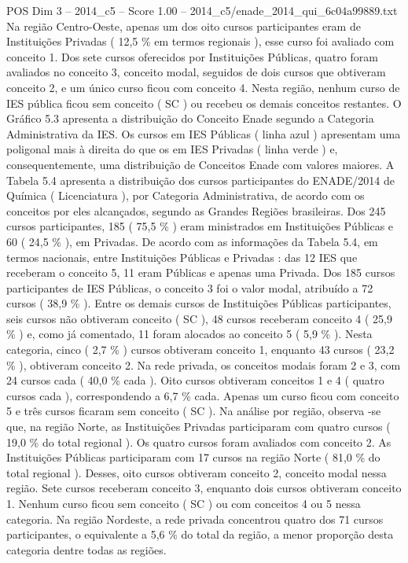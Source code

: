 \begin{textsample}{POS Dim 3 – 2014\_c5 – Score 1.00 – 2014\_c5/enade\_2014\_qui\_6c04a99889.txt}
Na região Centro-Oeste, apenas um dos oito cursos participantes eram de Instituições Privadas ( 12,5 \% em termos regionais ), esse curso foi avaliado com conceito 1.
Dos sete cursos oferecidos por Instituições Públicas, quatro foram avaliados no conceito 3, conceito modal, seguidos de dois cursos que obtiveram conceito 2, e um único curso ficou com conceito 4.
Nesta região, nenhum curso de IES pública ficou sem conceito ( SC ) ou recebeu os demais conceitos restantes.
O Gráfico 5.3 apresenta a distribuição do Conceito Enade segundo a Categoria Administrativa da IES.
Os cursos em IES Públicas ( linha azul ) apresentam uma poligonal mais à direita do que os em IES Privadas ( linha verde ) e, consequentemente, uma distribuição de Conceitos Enade com valores maiores.
A Tabela 5.4 apresenta a distribuição dos cursos participantes do ENADE/2014 de Química ( Licenciatura ), por Categoria Administrativa, de acordo com os conceitos por eles alcançados, segundo as Grandes Regiões brasileiras.
Dos 245 cursos participantes, 185 ( 75,5 \% ) eram ministrados em Instituições Públicas e 60 ( 24,5 \% ), em Privadas.
De acordo com as informações da Tabela 5.4, em termos nacionais, entre Instituições Públicas e Privadas : das 12 IES que receberam o conceito 5, 11 eram Públicas e apenas uma Privada.
Dos 185 cursos participantes de IES Públicas, o conceito 3 foi o valor modal, atribuído a 72 cursos ( 38,9 \% ).
Entre os demais cursos de Instituições Públicas participantes, seis cursos não obtiveram conceito ( SC ), 48 cursos receberam conceito 4 ( 25,9 \% ) e, como já comentado, 11 foram alocados ao conceito 5 ( 5,9 \% ).
Nesta categoria, cinco ( 2,7 \% ) cursos obtiveram conceito 1, enquanto 43 cursos ( 23,2 \% ), obtiveram conceito 2.
Na rede privada, os conceitos modais foram 2 e 3, com 24 cursos cada ( 40,0 \% cada ).
Oito cursos obtiveram conceitos 1 e 4 ( quatro cursos cada ), correspondendo a 6,7 \% cada.
Apenas um curso ficou com conceito 5 e três cursos ficaram sem conceito ( SC ).
Na análise por região, observa -se que, na região Norte, as Instituições Privadas participaram com quatro cursos ( 19,0 \% do total regional ).
Os quatro cursos foram avaliados com conceito 2.
As Instituições Públicas participaram com 17 cursos na região Norte ( 81,0 \% do total regional ).
Desses, oito cursos obtiveram conceito 2, conceito modal nessa região.
Sete cursos receberam conceito 3, enquanto dois cursos obtiveram conceito 1.
Nenhum curso ficou sem conceito ( SC ) ou com conceitos 4 ou 5 nessa categoria.
Na região Nordeste, a rede privada concentrou quatro dos 71 cursos participantes, o equivalente a 5,6 \% do total da região, a menor proporção desta categoria dentre todas as regiões.

\end{textsample}
